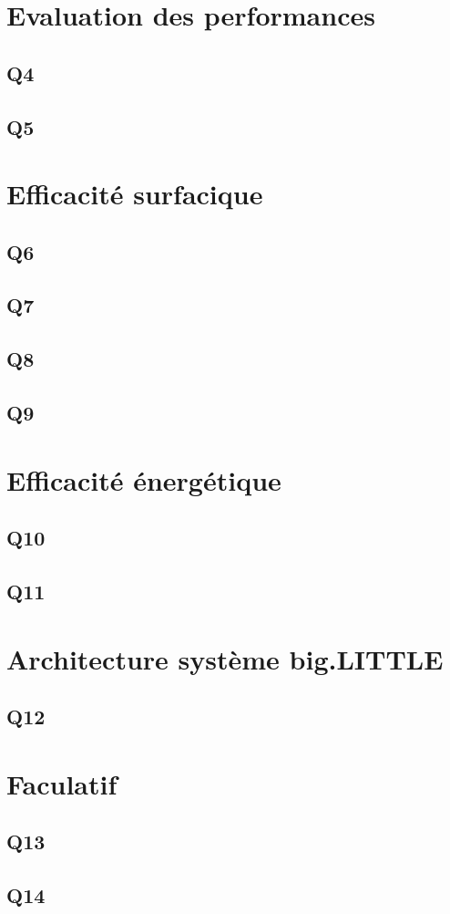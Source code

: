\documentclass[a4paper]{article}
\theoremstyle{plain}
\begin{document}
	
	\newpage
	\section{Evaluation des performances}
	    \subsection{Q4}
	    

	    \subsection{Q5}
	    	
	
	    
	 \newpage
	 \section{Efficacité surfacique} 
	    \subsection{Q6}
	   

	    \subsection{Q7}
	   

 		\subsection{Q8}


 		\subsection{Q9}
		
	  
    \newpage
	\section{Efficacité énergétique}
		\subsection{Q10}


		\subsection{Q11}


	\newpage
	\section{Architecture système big.LITTLE}
		\subsection{Q12}


	\newpage
	\section{Faculatif}
		\subsection{Q13}


		\subsection{Q14}


	    
\end{document}
